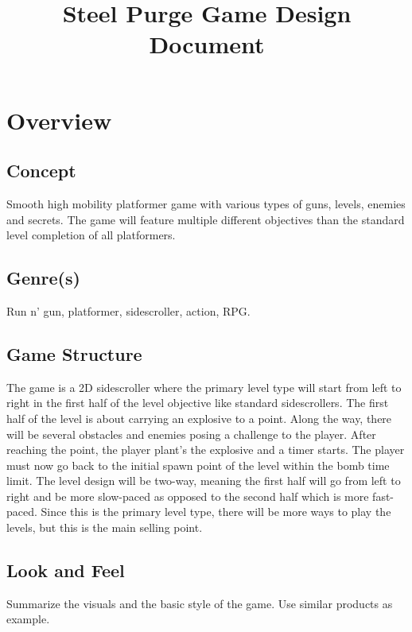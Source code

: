 \documentclass[12pt]{article}
\title{Steel Purge Game Design Document}
\begin{document}
\maketitle{}

\section{Overview}


\subsection{Concept}

Smooth high mobility platformer game with various types of guns, levels, enemies and secrets. The game will feature multiple different objectives than the standard level completion of all platformers. 

\subsection{Genre(s)}

Run n' gun, platformer, sidescroller, action, RPG.

\subsection{Game Structure}

The game is a 2D sidescroller where the primary level type will start from left to right in the first half of the level objective like standard sidescrollers. The first half of the level is about carrying an explosive to a point. Along the way, there will be several obstacles and enemies posing a challenge to the player. After reaching the point, the player plant's the explosive and a timer starts. The player must now go back to the initial spawn point of the level within the bomb time limit. The level design will be two-way, meaning the first half will go from left to right and be more slow-paced as opposed to the second half which is more fast-paced. Since this is the primary level type, there will be more ways to play the levels, but this is the main selling point. 

\subsection{Look and Feel}

Summarize the visuals and the basic style of the game. Use similar products as example. 
\end{document}
